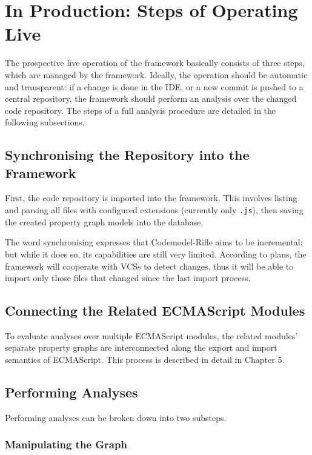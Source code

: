 \section{In Production: Steps of Operating Live}

The prospective live operation of the framework basically consists of three steps, which are managed by the framework. Ideally, the operation should be automatic and transparent: if a change is done in the IDE, or a new commit is pushed to a central repository, the framework should perform an analysis over the changed code repository. The steps of a full analysis procedure are detailed in the following subsections.


\subsection{Synchronising the Repository into the Framework}

First, the code repository is imported into the framework. This involves listing and parsing all files with configured extensions (currently only \texttt{.js}), then saving the created property graph models into the database.

The word synchronising expresses that Codemodel-Rifle aims to be incremental; but while it does so, its capabilities are still very limited. According to plans, the framework will cooperate with VCSs to detect changes, thus it will be able to import only those files that changed since the last import process.


\subsection{Connecting the Related ECMAScript Modules}

To evaluate analyses over multiple ECMAScript modules, the related modules' separate property graphs are interconnected along the export and import semantics of ECMAScript. This process is described in detail in Chapter 5.


\subsection{Performing Analyses}

Performing analyses can be broken down into two substeps.


\subsubsection{Manipulating the Graph}

